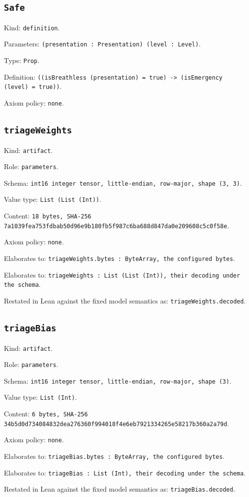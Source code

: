 \documentclass[11pt]{article}
\begin{document}
\subsection*{\texttt{Safe}}
\noindent Kind: \texttt{definition}.\par
\noindent Parameters: \texttt{(presentation : Presentation) (level : Level)}.\par
\noindent Type: \texttt{Prop}.\par
\noindent Definition: \texttt{((isBreathless (presentation) = true) -> (isEmergency (level) = true))}.\par
\noindent Axiom policy: \texttt{none}.\par
\subsection*{\texttt{triageWeights}}
\noindent Kind: \texttt{artifact}.\par
\noindent Role: \texttt{parameters}.\par
\noindent Schema: \texttt{int16 integer tensor, little-endian, row-major, shape (3, 3)}.\par
\noindent Value type: \texttt{List (List (Int))}.\par
\noindent Content: \texttt{18 bytes, SHA-256 7a1039fea753fdbab50d96e9b180fb5f987c6ba688d847da0e209608c5c0f58e}.\par
\noindent Axiom policy: \texttt{none}.\par
\noindent Elaborates to: \texttt{triageWeights.bytes : ByteArray, the configured bytes}.\par
\noindent Elaborates to: \texttt{triageWeights : List (List (Int)), their decoding under the schema}.\par
\noindent Restated in Lean against the fixed model semantics as: \texttt{triageWeights.decoded}.\par
\subsection*{\texttt{triageBias}}
\noindent Kind: \texttt{artifact}.\par
\noindent Role: \texttt{parameters}.\par
\noindent Schema: \texttt{int16 integer tensor, little-endian, row-major, shape (3)}.\par
\noindent Value type: \texttt{List (Int)}.\par
\noindent Content: \texttt{6 bytes, SHA-256 34b5d0d734084832dea276360f994018f4e6eb7921334265e58217b360a2a79d}.\par
\noindent Axiom policy: \texttt{none}.\par
\noindent Elaborates to: \texttt{triageBias.bytes : ByteArray, the configured bytes}.\par
\noindent Elaborates to: \texttt{triageBias : List (Int), their decoding under the schema}.\par
\noindent Restated in Lean against the fixed model semantics as: \texttt{triageBias.decoded}.\par
\end{document}
